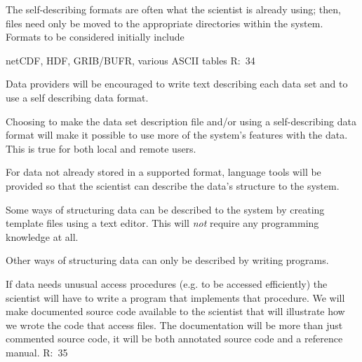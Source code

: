 \begin{list}{}{}
\item The self-describing formats are often what the scientist is
already using; then, files need only be moved to the appropriate
directories within the system. Formats to be considered initially
include
\begin{list}{--}{}

\item netCDF, HDF, GRIB/BUFR, various ASCII tables
       R:~34

\item Data providers will be encouraged to write text describing each data 
       set and to use a self describing data format.

\item Choosing to make the data set description file and/or using a
       self-describing data format will make it possible to use more of
       the system's features with the data. This is true for both local
       and remote users.

\end{list}

\item For data not already stored in a supported format, language tools
will be provided so that the scientist can describe the data's
structure to the system.
\begin{list}{--}{}

\item Some ways of structuring data can be described to the system by
       creating template files using a text editor. This will {\em not\/}
       require any programming knowledge at all.

\item Other ways of structuring data can only be described by writing
       programs.

\begin{list}{--}{}

     \item If data needs unusual access procedures (e.g. to be accessed
           efficiently) the scientist will have to write a program that
           implements that procedure. We will make documented source
           code available to the scientist that will illustrate how we
           wrote the code that access files.  The documentation will
           be more than just commented source code, it will be both
           annotated source code and a reference manual. 
             R:~35

\end{list}


\end{list}
\end{list}
